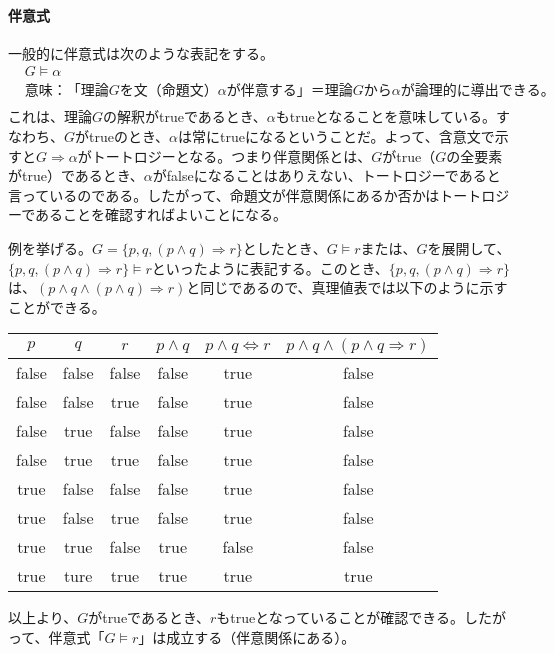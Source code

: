 \documentclass[dvipdfmx]{jsarticle}
\begin{document}
\paragraph{伴意式}一般的に伴意式は次のような表記をする。
\begin{align*}
  & G \models \alpha \\
  &意味：「理論Gを文（命題文）\alpha が伴意する」＝ 理論Gから\alpha が論理的に導出できる。\\
\end{align*}
これは、理論$G$の解釈がtrueであるとき、$\alpha$もtrueとなることを意味している。すなわち、$G$がtrueのとき、$\alpha$は常にtrueになるということだ。よって、含意文で示すと$G \Rightarrow \alpha がトートロジー$となる。つまり伴意関係とは、$G$がtrue（$G$の全要素がtrue）であるとき、$\alpha$がfalseになることはありえない、トートロジーであると言っているのである。したがって、命題文が伴意関係にあるか否かはトートロジーであることを確認すればよいことになる。\par
例を挙げる。$G = \{p, q, (p \wedge q)\Rightarrow r\}としたとき、G \models r$または、$G$を展開して、$\{p, q, (p \wedge q)\Rightarrow r\} \models r$といったように表記する。このとき、$\{p, q, (p \wedge q)\Rightarrow r\}$は、$(p \wedge q \wedge (p\wedge q)\Rightarrow r)$と同じであるので、真理値表では以下のように示すことができる。
\begin{table}[H]
  \centering
\begin{tabular}{|ccc||c|c|c|} \hline
$p$   & $q$   & $r$   & $p \wedge q$ & $p\wedge q \Leftrightarrow r$ & $p \wedge q \wedge (p \wedge q \Rightarrow r)$ \\ \hline
false & false & false & false        & true                          & false                                          \\ \hline
false & false & true  & false        & true                          & false                                          \\ \hline
false & true  & false & false        & true                          & false                                          \\ \hline
false & true  & true  & false        & true                          & false                                          \\ \hline
true  & false & false & false        & true                          & false                                          \\ \hline
true  & false & true  & false        & true                          & false                                          \\ \hline
true  & true  & false & true         & false                         & false                                          \\ \hline
true  & ture  & true  & true         & true                          & true \\ \hline
\end{tabular}
\end{table}
以上より、$G$がtrueであるとき、$r$もtrueとなっていることが確認できる。したがって、伴意式「$G \models r$」は成立する（伴意関係にある）。
\end{document}
